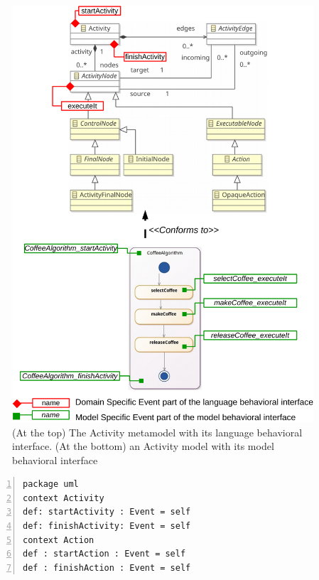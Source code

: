 \begin{figure}
	\begin{center}
		\includegraphics[width=1\textwidth]{bcool/figs/activitylang}
		\caption{(At the top) The Activity metamodel with its language behavioral interface. (At the bottom) an Activity model with its model behavioral interface}
		\label{fig:activitymm}
	\end{center}
\end{figure}


\begin{lstlisting}[language=ecl,
caption={Partial \ecl specification of Activity Diagram},
label={fig:eclfuml}, 
basicstyle=\scriptsize\ttfamily, backgroundcolor=\color{LGrey}, numbers=left, xleftmargin=3pt, belowskip=-0.4em]
package uml
context Activity
def: startActivity : Event = self
def: finishActivity: Event = self
context Action
def : startAction : Event = self
def : finishAction : Event = self
\end{lstlisting}
